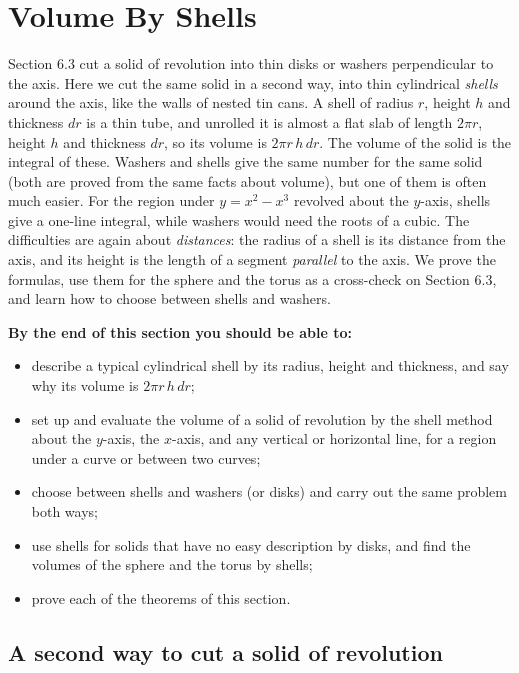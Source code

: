 \documentclass[11pt]{article}
\begin{document}
\section{Volume By Shells}

\begin{guide}
Section 6.3 cut a solid of revolution into thin disks or washers perpendicular to the axis. Here we cut the same solid in a second way, into thin cylindrical \emph{shells} around the axis, like the walls of nested tin cans. A shell of radius $r$, height $h$ and thickness $dr$ is a thin tube, and unrolled it is almost a flat slab of length $2\pi r$, height $h$ and thickness $dr$, so its volume is $2\pi r\,h\,dr$. The volume of the solid is the integral of these. Washers and shells give the same number for the same solid (both are proved from the same facts about volume), but one of them is often much easier. For the region under $y=x^2-x^3$ revolved about the $y$-axis, shells give a one-line integral, while washers would need the roots of a cubic. The difficulties are again about \emph{distances}: the radius of a shell is its distance from the axis, and its height is the length of a segment \emph{parallel} to the axis. We prove the formulas, use them for the sphere and the torus as a cross-check on Section 6.3, and learn how to choose between shells and washers.
\end{guide}

\textbf{By the end of this section you should be able to:}
\begin{itemize}
  \item describe a typical cylindrical shell by its radius, height and thickness, and say why its volume is $2\pi r\,h\,dr$;
  \item set up and evaluate the volume of a solid of revolution by the shell method about the $y$-axis, the $x$-axis, and any vertical or horizontal line, for a region under a curve or between two curves;
  \item choose between shells and washers (or disks) and carry out the same problem both ways;
  \item use shells for solids that have no easy description by disks, and find the volumes of the sphere and the torus by shells;
  \item prove each of the theorems of this section.
\end{itemize}

\subsection*{A second way to cut a solid of revolution}
\end{document}
